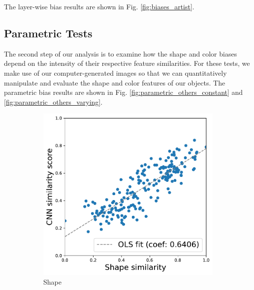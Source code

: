 The layer-wise bias results are shown in Fig. \ref{fig:biases_artist}.

\subsection{Parametric Tests}
The second step of our analysis is to examine how the shape and color biases depend on the intensity
of their respective feature similarities. For these tests, we make use of our computer-generated
images so that we can quantitatively manipulate and evaluate the shape and color features of our
objects. The parametric bias results are shown in Fig. \ref{fig:parametric_others_constant} and
\ref{fig:parametric_others_varying}.
\begin{figure}[h!]
    \begin{center}
        \begin{subfigure}[b]{0.235\textwidth}
            \includegraphics[width=\linewidth]{figures/vgg_shape_parametric_others_constant.pdf}
            \caption{Shape}
        \end{subfigure}
        \begin{subfigure}[b]{0.235\textwidth}

\end{subfigure}
\end{center}
\end{figure}
